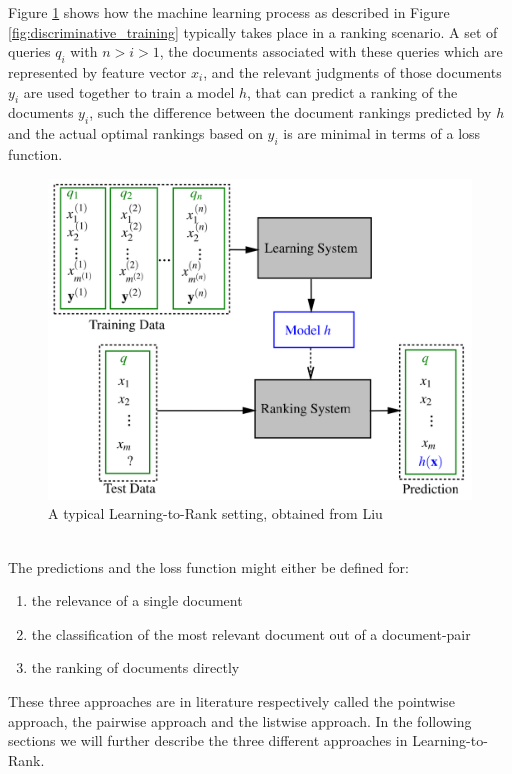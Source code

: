 Figure \ref{fig:ltr_framework} shows how the machine learning process as described in Figure \ref{fig:discriminative_training} typically takes place in a ranking scenario. A set of queries $q_i$ with $n > i > 1$, the documents associated with these queries which are represented by feature vector $x_i$, and the relevant judgments of those documents $y_i$ are used together to train a model $h$, that can predict a ranking of the documents $y_i$, such the difference between the document rankings predicted by $h$ and the actual optimal rankings based on $y_i$ is are minimal in terms of a loss function.
\begin{figure}[!h]
\includegraphics[scale=0.25]{gfx/ltr_framework}
\caption{A typical Learning-to-Rank setting, obtained from Liu\cite{Liu2007}}
\label{fig:ltr_framework}
\end{figure}\\

The predictions and the loss function might either be defined for:
\begin{enumerate}
\item the relevance of a single document
\item the classification of the most relevant document out of a document-pair
\item the ranking of documents directly
\end{enumerate}
These three approaches are in literature respectively called the pointwise approach, the pairwise approach and the listwise approach. In the following sections we will further describe the three different approaches in Learning-to-Rank.

